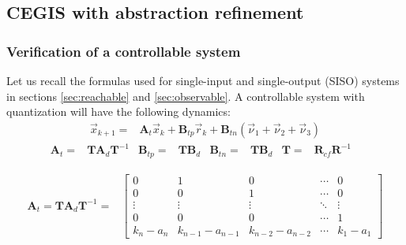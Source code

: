 \documentclass[runningheads,a4paper]{llncs}
\newcommand{\addtodo}[1]{{\color{red} TODO: #1}}
\newcommand{\mat}[1]{\boldsymbol{#1}}
\begin{document}
\subsection{CEGIS with abstraction refinement}
\label{sec:CEGIS-abstraction-refinement}



\subsubsection{Verification of a controllable system}
\label{sec:cof_verification}

Let us recall the formulas used for single-input and single-output (SISO) systems 
in sections \ref{sec:reachable} and \ref{sec:observable}.
A controllable system with quantization will have the following dynamics:
%
\begin{align}
\label{eq:observer_LTI_cf}
\vec{x}_{k+1}=&\mat{A}_{t}\vec{x}_k+\mat{B}_{tp} \vec{r}_k+\mat{B}_{tn} (\vec{\nu}_1 + \vec{\nu}_2 + \vec{\nu}_3)
\end{align}
\begin{align*}
\mat{A}_{t}=&\mat{T}\mat{A}_d\mat{T}^{-1}&
\mat{B}_{tp}=&\mat{T}\mat{B}_d&
\mat{B}_{tn}=&\mat{T}\mat{B}_d&
\mat{T}=&\mat{R}_{cf}\mat{R}^{-1}&
\end{align*}

\begin{align*}
\mat{A}_{t}=\mat{T}\mat{A}_d\mat{T}^{-1}=&\left[
\begin{array}{ccccc}
0&1&0&\cdots&0\\
0&0&1&\cdots&0\\
\vdots&\vdots&\vdots&\ddots&\vdots\\
0&0&0&\cdots&1\\
k_n-a_n&k_{n-1}-a_{n-1}&k_{n-2}-a_{n-2}&\cdots&k_1-a_1
\end{array}\right]
\label{eq:cf_SISO_2}
\end{align*}
\end{document}
